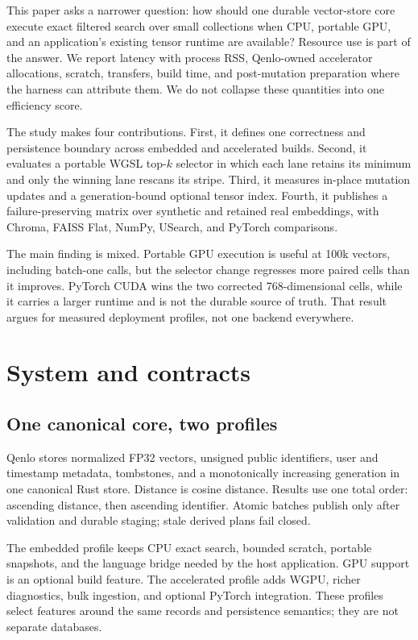 \documentclass[10pt]{article}
\newcommand{\qenlo}{Qenlo}
\begin{document}
This paper asks a narrower question: how should one durable vector-store core execute exact filtered search over small collections when CPU, portable GPU, and an application's existing tensor runtime are available? Resource use is part of the answer. We report latency with process RSS, \qenlo-owned accelerator allocations, scratch, transfers, build time, and post-mutation preparation where the harness can attribute them. We do not collapse these quantities into one efficiency score.

The study makes four contributions. First, it defines one correctness and persistence boundary across embedded and accelerated builds. Second, it evaluates a portable WGSL top-\(k\) selector in which each lane retains its minimum and only the winning lane rescans its stripe. Third, it measures in-place mutation updates and a generation-bound optional tensor index. Fourth, it publishes a failure-preserving matrix over synthetic and retained real embeddings, with Chroma, FAISS Flat, NumPy, USearch, and PyTorch comparisons.

The main finding is mixed. Portable GPU execution is useful at 100k vectors, including batch-one calls, but the selector change regresses more paired cells than it improves. PyTorch CUDA wins the two corrected 768-dimensional cells, while it carries a larger runtime and is not the durable source of truth. That result argues for measured deployment profiles, not one backend everywhere.

\section{System and contracts}
\subsection{One canonical core, two profiles}
\qenlo{} stores normalized FP32 vectors, unsigned public identifiers, user and timestamp metadata, tombstones, and a monotonically increasing generation in one canonical Rust store. Distance is cosine distance. Results use one total order: ascending distance, then ascending identifier. Atomic batches publish only after validation and durable staging; stale derived plans fail closed.

The embedded profile keeps CPU exact search, bounded scratch, portable snapshots, and the language bridge needed by the host application. GPU support is an optional build feature. The accelerated profile adds WGPU, richer diagnostics, bulk ingestion, and optional PyTorch integration. These profiles select features around the same records and persistence semantics; they are not separate databases.
\end{document}
